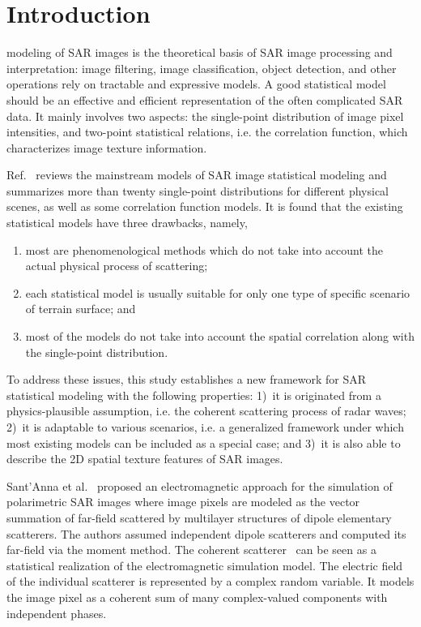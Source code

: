\documentclass[journal]{IEEEtran}
\begin{document}
\maketitle

\IEEEdisplaynontitleabstractindextext

\IEEEpeerreviewmaketitle

\section{Introduction}

 modeling of SAR images is the theoretical basis of SAR image processing and interpretation: image filtering, image classification, object detection, and other operations rely on tractable and expressive models.
A good statistical model should be an effective and efficient representation of the often complicated SAR data.
It mainly involves two aspects: the single-point distribution of image pixel intensities, and two-point statistical relations, i.e. the correlation function, which characterizes image texture information.

Ref.~\cite{Yue:2019b} reviews the mainstream models of SAR image statistical modeling and summarizes more than twenty single-point distributions for different physical scenes, as well as some correlation function models.
It is found that the existing statistical models have three drawbacks, namely,
\begin{enumerate}
\item most are phenomenological methods which do not take into account the actual physical process of scattering;
\item each statistical model is usually suitable for only one type of specific scenario of terrain surface; and
\item most of the models do not take into account the spatial correlation along with the single-point distribution.
\end{enumerate}

To address these issues, this study establishes a new framework for SAR statistical modeling with the following properties: 1)~it is originated from a physics-plausible assumption, i.e. the coherent scattering process of radar waves; 2)~it is adaptable to various scenarios, i.e. a generalized framework under which most existing models can be included as a special case; and 3)~it is also able to describe the 2D spatial texture features of SAR images.

Sant'Anna et al.~\cite{Sant:2008} proposed an electromagnetic approach for the simulation of polarimetric SAR images where image pixels are modeled as the vector summation of far-field scattered by multilayer structures of dipole elementary scatterers.
The authors assumed independent dipole scatterers and computed its far-field via the moment method.
The coherent scatterer~\cite{Oliver:2004} can be seen as a statistical realization of the electromagnetic simulation model.
The electric field of the individual scatterer is represented by a complex random variable.
It models the image pixel as a coherent sum of many complex-valued components with independent phases.
\end{document}
